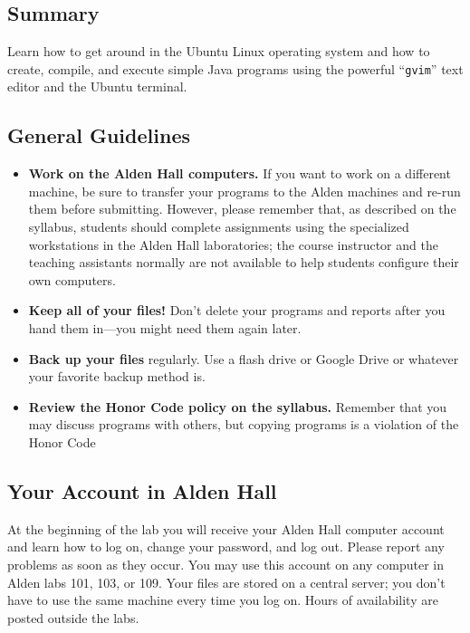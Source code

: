 



\subsection*{Summary}

Learn how to get around in the Ubuntu Linux operating system and how to create, compile, and execute simple Java
programs using the powerful ``{\tt gvim}'' text editor and the Ubuntu terminal.

\subsection*{General Guidelines}

\begin{itemize}
  \setlength{\itemsep}{0pt}

  \item {\bf Work on the Alden Hall computers.} If you want to work on a different machine, be sure to transfer your
    programs to the Alden machines and re-run them before submitting. However, please remember that, as described on the
    syllabus, students should complete assignments using the specialized workstations in the Alden Hall laboratories;
    the course instructor and the teaching assistants normally are not available to help students configure their own
    computers.

  \item {\bf Keep all of your files!} Don't delete your programs and reports after you hand them in---you might need
    them again later.

  \item {\bf Back up your files} regularly. Use a flash drive or Google Drive or whatever your favorite backup method
    is.

  \item {\bf Review the Honor Code policy on the syllabus.} Remember that you may discuss programs with others, but
    copying programs is a violation of the Honor Code

\end{itemize}

\subsection*{Your Account in Alden Hall}
At the beginning of the lab you will receive your Alden Hall computer account and
learn how to log on, change your password, and log out. 
Please report any problems as soon as they occur. You may use this account on
any computer in Alden labs 101, 103, or 109. Your files are stored on a central 
server; you don't have to use the same machine every time you log on. 
Hours of availability are posted outside the labs.

